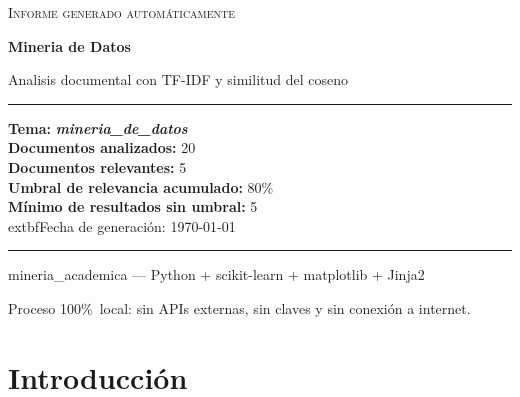 \documentclass[11pt,a4paper]{article}
\newcommand{\tema}[1]{\textbf{\textit{#1}}}
\newcommand{\pcento}{\%}
\begin{document}
\begin{titlepage}
  \centering
  \vspace*{2.0cm}

  {\Large\textsc{Informe generado automáticamente}\par}
  \vspace{0.7cm}
  {\huge\bfseries Mineria de Datos\par}
  \vspace{0.4cm}
  {\large Analisis documental con TF-IDF y similitud del coseno\par}

  \vspace{1.8cm}

  \begin{minipage}{0.92\textwidth}
    \hrule
    \vspace{0.4cm}
    {\small
    \textbf{Tema:} \tema{ mineria\_de\_datos }\\[4pt]
    \textbf{Documentos analizados:} 20\\
    \textbf{Documentos relevantes:} 5\\
    \textbf{Umbral de relevancia acumulado:} 80\pcento\\
    \textbf{Mínimo de resultados sin umbral:} 5\\
      	extbf{Fecha de generación:} \today
    \par}
    \vspace{0.4cm}
    \hrule
  \end{minipage}

  \vfill

  {\small mineria\_academica --- Python + scikit-learn + matplotlib + Jinja2\par}
  {\footnotesize
   Proceso 100\pcento\ local: sin APIs externas, sin claves y sin conexión
   a internet.\par}
\end{titlepage}

\tableofcontents
\newpage

\section{Introducción}
\label{sec:introduccion}
\end{document}
